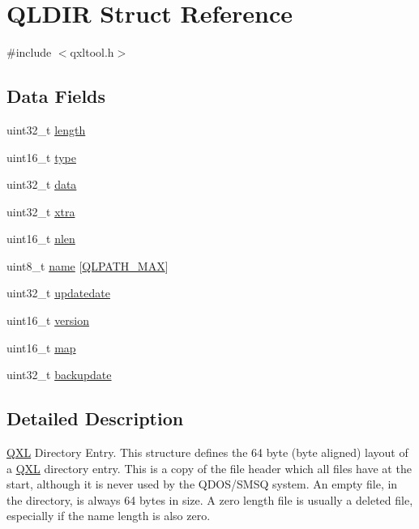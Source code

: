 \hypertarget{struct_q_l_d_i_r}{}\section{Q\+L\+D\+IR Struct Reference}
\label{struct_q_l_d_i_r}


{\ttfamily \#include $<$qxltool.\+h$>$}

\subsection*{Data Fields}
\begin{DoxyCompactItemize}
\item 
uint32\+\_\+t \hyperlink{struct_q_l_d_i_r_aebb70c2aab3407a9f05334c47131a43b}{length}
\item 
uint16\+\_\+t \hyperlink{struct_q_l_d_i_r_acb5cfd209ba75c853d03f701e7f91679}{type}
\item 
uint32\+\_\+t \hyperlink{struct_q_l_d_i_r_a1e43bf7d608e87228b625cca2c04d641}{data}
\item 
uint32\+\_\+t \hyperlink{struct_q_l_d_i_r_a11b4492a1b6004ab012f6a7d2525cc3c}{xtra}
\item 
uint16\+\_\+t \hyperlink{struct_q_l_d_i_r_a2b7cf049da1288b6cd8e8380a4455f1e}{nlen}
\item 
uint8\+\_\+t \hyperlink{struct_q_l_d_i_r_a9b899bc186aef90a5f62cf48e1382106}{name} \mbox{[}\hyperlink{qxltool_8h_a723f2285fc63a29eaecf346acf4c184b}{Q\+L\+P\+A\+T\+H\+\_\+\+M\+AX}\mbox{]}
\item 
uint32\+\_\+t \hyperlink{struct_q_l_d_i_r_a52c3c44e31eb489b1913b30e8d1ac88f}{updatedate}
\item 
uint16\+\_\+t \hyperlink{struct_q_l_d_i_r_ab6d7b6f8c2ceaba7acda80aaf05f4899}{version}
\item 
uint16\+\_\+t \hyperlink{struct_q_l_d_i_r_a3a923b731660d8f74929feb1be3bfc56}{map}
\item 
uint32\+\_\+t \hyperlink{struct_q_l_d_i_r_a5ef1b85423e9bee3fd10b60a6f053516}{backupdate}
\end{DoxyCompactItemize}


\subsection{Detailed Description}
\hyperlink{struct_q_x_l}{Q\+XL} Directory Entry. This structure defines the 64 byte (byte aligned) layout of a \hyperlink{struct_q_x_l}{Q\+XL} directory entry. This is a copy of the file header which all files have at the start, although it is never used by the Q\+D\+O\+S/\+S\+M\+SQ system. An empty file, in the directory, is always 64 bytes in size. A zero length file is usually a deleted file, especially if the name length is also zero. 


